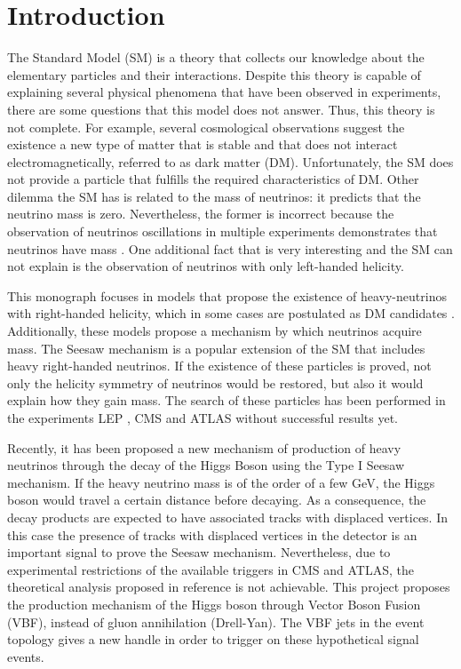 \chapter{Introduction}
\label{Introduction_chapter}


The Standard Model (SM) is a theory that collects our knowledge about the elementary particles and their interactions. Despite this theory is capable of explaining several physical phenomena that have been observed in experiments, there are some questions that this model does not answer. Thus, this theory is not complete. For example, several cosmological observations suggest the existence a new type of matter that is stable and that does not interact electromagnetically, referred to as dark matter (DM). Unfortunately, the SM does not provide a particle that fulfills the required characteristics of DM. Other dilemma the SM has is related to the mass of neutrinos: it predicts that the neutrino mass is zero. Nevertheless, the former is incorrect because the observation of neutrinos oscillations in multiple experiments demonstrates that neutrinos have mass \cite{Neutrino experiment 1 mass, Neutrino experiment 2 mass}. One additional fact that is very interesting and the SM can not explain is the observation of neutrinos with only left-handed helicity. 

This monograph focuses in models that propose the existence of heavy-neutrinos with right-handed helicity, which in some cases are postulated as DM candidates \cite{Neutrino dark matter candidate 1, Neutrino dark matter candidate 2}. Additionally, these models propose a mechanism by which neutrinos acquire mass. The Seesaw mechanism is a popular extension of the SM that includes heavy right-handed neutrinos. If the existence of these particles is proved, not only the helicity symmetry of neutrinos would be restored, but also it would explain how they gain mass. The search of these particles has been performed in the experiments LEP \cite{Lep experiment}, CMS \cite{CMS experiment} and ATLAS \cite{ATLAS experiment} without successful results yet.

Recently, it has been proposed a new mechanism of production of heavy neutrinos through the decay of the Higgs Boson \cite{Seesaw Mechanism with displaced vertices} using the Type I Seesaw mechanism. If the heavy neutrino mass is of the order of a few GeV, the Higgs boson would travel a certain distance before decaying. As a consequence, the decay products are expected to have associated tracks with displaced vertices. In this case the presence of tracks with displaced vertices in the detector is an important signal to prove the Seesaw mechanism. Nevertheless, due to experimental restrictions of the available triggers in CMS and ATLAS, the theoretical analysis proposed in reference \cite{Seesaw Mechanism with displaced vertices} is not achievable. This project proposes the production mechanism of the Higgs boson through Vector Boson Fusion (VBF), instead of gluon annihilation (Drell-Yan). The VBF jets in the event topology gives a new handle in order to trigger on these hypothetical signal events.

